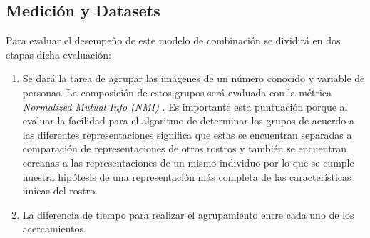 \documentclass[letterpaper, 10 pt, conference]{ieeeconf}  %
\begin{document}
    \subsection{Medición y Datasets}
    Para evaluar el desempeño de este modelo de combinación se dividirá en dos etapas dicha
    evaluación:
    \begin{enumerate}
        \item Se dará la tarea de agrupar las imágenes de un número conocido y variable de
            personas. La composición de estos grupos será evaluada con la métrica
            \textit{Normalized Mutual Info (NMI)} \cite{NMI}. Es importante esta puntuación porque
            al evaluar la facilidad para el algoritmo de determinar los grupos de acuerdo a las
            diferentes representaciones significa que estas se encuentran separadas a comparación
            de representaciones de otros rostros y también se encuentran cercanas a las
            representaciones de un mismo individuo por lo que se cumple nuestra hipótesis de una
            representación más completa de las características únicas del rostro.
        \item La diferencia de tiempo para realizar el agrupamiento entre cada uno de los
            acercamientos.
    \end{enumerate}
\end{document}
